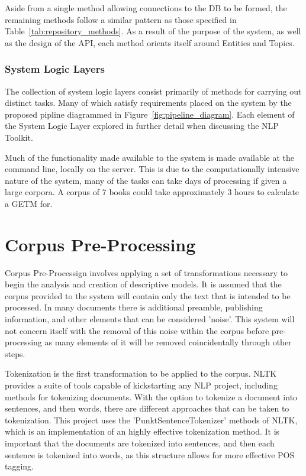 \documentclass[10pt]{report}
\begin{document}
Aside from a single method allowing connections to the DB to be formed, the remaining methods follow a similar pattern as those specified in Table~\ref{tab:repository_methods}. As a result of the purpose of the system, as well as the design of the API, each method orients itself around Entities and Topics.

\subsubsection{System Logic Layers}
The collection of system logic layers consist primarily of methods for carrying out distinct tasks. Many of which satisfy requirements placed on the system by the proposed pipline diagrammed in Figure~\ref{fig:pipeline_diagram}. Each element of the System Logic Layer explored in further detail when discussing the NLP Toolkit.

Much of the functionality made available to the system is made available at the command line, locally on the server. This is due to the computationally intensive nature of the system, many of the tasks can take days of processing if given a large corpora. A corpus of 7 books could take approximately 3 hours to calculate a GETM for.

\section{Corpus Pre-Processing}

Corpus Pre-Processign involves applying a set of transformations necessary to begin the analysis and creation of descriptive models. It is assumed that the corpus provided to the system will contain only the text that is intended to be processed. In many documents there is additional preamble, publishing information, and other elements that can be considered 'noise'. This system will not concern itself with the removal of this noise within the corpus before pre-processing as many elements of it will be removed coincidentally through other steps.

Tokenization is the first transformation to be applied to the corpus. NLTK provides a suite of tools capable of kickstarting any NLP project, including methods for tokenizing documents. With the option to tokenize a document into sentences, and then words, there are different approaches that can be taken to tokenization. This project uses the 'PunktSentenceTokenizer' methods of NLTK, which is an implementation of an highly effective tokenization method.\cite{Kiss2006-cm} It is important that the documents are tokenized into sentences, and then each sentence is tokenized into words, as this structure allows for more effective POS tagging.
\end{document}
